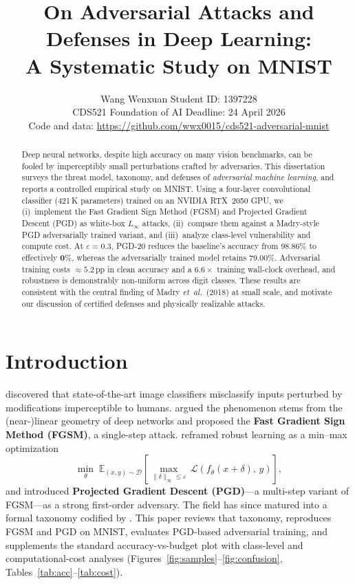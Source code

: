 \documentclass[10pt, twocolumn]{article}
\title{\vspace{-1.2cm}\textbf{\large On Adversarial Attacks and Defenses in Deep Learning:\\ A Systematic Study on MNIST}}
\author{\normalsize Wang Wenxuan \quad\textbar\quad Student ID: 1397228 \\
\small CDS521 Foundation of AI \quad\textbar\quad Deadline: 24 April 2026 \\
\footnotesize Code and data: \url{https://github.com/wwx0015/cds521-adversarial-mnist}}
\date{\vspace{-1em}}
\begin{document}
\maketitle
\thispagestyle{empty}

\begin{abstract}
\small
Deep neural networks, despite high accuracy on many vision benchmarks, can be fooled by imperceptibly small perturbations crafted by adversaries. This dissertation surveys the threat model, taxonomy, and defenses of \emph{adversarial machine learning}, and reports a controlled empirical study on MNIST. Using a four-layer convolutional classifier (421\,K parameters) trained on an NVIDIA RTX~2050 GPU, we (i)~implement the Fast Gradient Sign Method (FGSM) and Projected Gradient Descent (PGD) as white-box $L_\infty$ attacks, (ii)~compare them against a Madry-style PGD adversarially trained variant, and (iii)~analyze class-level vulnerability and compute cost. At $\varepsilon\!=\!0.3$, PGD-20 reduces the baseline's accuracy from $\mathbf{98.86\%}$ to effectively $\mathbf{0\%}$, whereas the adversarially trained model retains $\mathbf{79.00\%}$. Adversarial training costs $\approx\!5.2$\,pp in clean accuracy and a $6.6\times$ training wall-clock overhead, and robustness is demonstrably non-uniform across digit classes. These results are consistent with the central finding of Madry \emph{et~al.}~(2018) at small scale, and motivate our discussion of certified defenses and physically realizable attacks.
\end{abstract}

\section{Introduction}
\label{sec:intro}

\citet{szegedy2014intriguing} discovered that state-of-the-art image classifiers misclassify inputs perturbed by modifications imperceptible to humans. \citet{goodfellow2015explaining} argued the phenomenon stems from the (near-)linear geometry of deep networks and proposed the \textbf{Fast Gradient Sign Method (FGSM)}, a single-step attack. \citet{madry2018towards} reframed robust learning as a min--max optimization
\begin{equation}
\min_{\theta}\; \mathbb{E}_{(x,y)\sim\mathcal{D}}\!\left[\max_{\|\delta\|_\infty \le \varepsilon}\, \mathcal{L}\!\left(f_\theta(x+\delta),\,y\right)\right]\!,\label{eq:minmax}
\end{equation}
and introduced \textbf{Projected Gradient Descent (PGD)}---a multi-step variant of FGSM---as a strong first-order adversary. The field has since matured into a formal taxonomy codified by \citet{nist2021aml}. This paper reviews that taxonomy, reproduces FGSM and PGD on MNIST, evaluates PGD-based adversarial training, and supplements the standard accuracy-vs-budget plot with class-level and computational-cost analyses (Figures~\ref{fig:samples}--\ref{fig:confusion}, Tables~\ref{tab:acc}--\ref{tab:cost}).
\end{document}
